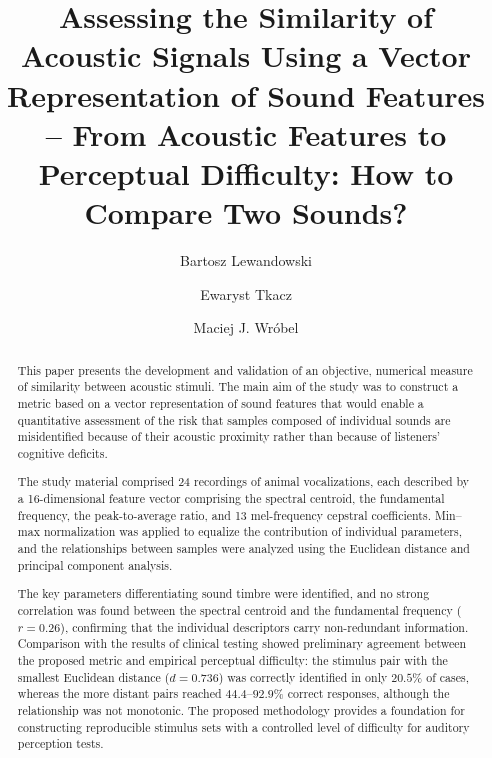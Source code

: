 \documentclass[preprint,12pt]{elsarticle}
\begin{document}
\begin{frontmatter}

\title{Assessing the Similarity of Acoustic Signals Using a Vector Representation of Sound Features\\
-- From Acoustic Features to Perceptual Difficulty: How to Compare Two Sounds?}

\author[a]{Bartosz Lewandowski}
\author[a]{Ewaryst Tkacz}
\author[b]{Maciej J. Wróbel}




\begin{abstract}

This paper presents the development and validation of an objective, numerical measure of similarity between acoustic stimuli. The main aim of the study was to construct a metric based on a vector representation of sound features that would enable a quantitative assessment of the risk that samples composed of individual sounds are misidentified because of their acoustic proximity rather than because of listeners' cognitive deficits.

The study material comprised 24 recordings of animal vocalizations, each described by a 16-dimensional feature vector comprising the spectral centroid, the fundamental frequency, the peak-to-average ratio, and 13 mel-frequency cepstral coefficients. Min--max normalization was applied to equalize the contribution of individual parameters, and the relationships between samples were analyzed using the Euclidean distance and principal component analysis.

The key parameters differentiating sound timbre were identified, and no strong correlation was found between the spectral centroid and the fundamental frequency ($r = 0.26$), confirming that the individual descriptors carry non-redundant information. Comparison with the results of clinical testing showed preliminary agreement between the proposed metric and empirical perceptual difficulty: the stimulus pair with the smallest Euclidean distance ($d = 0.736$) was correctly identified in only $20.5\%$ of cases, whereas the more distant pairs reached $44.4$--$92.9\%$ correct responses, although the relationship was not monotonic. The proposed methodology provides a foundation for constructing reproducible stimulus sets with a controlled level of difficulty for auditory perception tests.


\end{abstract}
\end{frontmatter}
\end{document}
